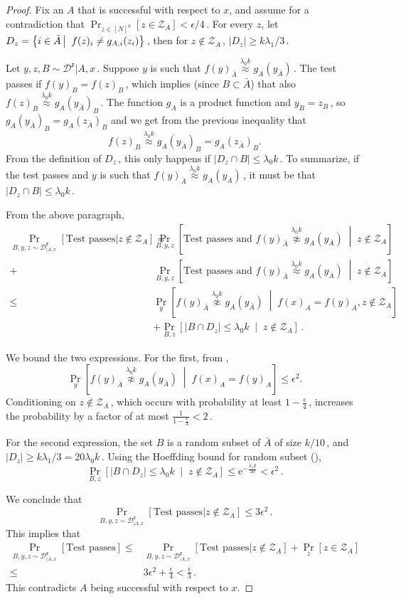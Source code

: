 \documentclass[11pt]{article}
\numberwithin{equation}{section}
\theoremstyle{definition}
\theoremstyle{plain}
\newcommand{\eee}{\mathrm e}
\newcommand{\Prob}[2][]{\Pr_{{#1}}\left[#2\right]} %
\newcommand{\abs}[1]{\lvert#1\rvert} %
\newcommand{\given}{\;\middle\vert\;} %
\newcommand\sett[2]{\left\{ #1 \left| \; \vphantom{#1 #2} \right. #2  \right\}} %
\newcommand\f{f} %
\newcommand{\g}{g} %
\newcommand\neql[1]{\stackrel{{#1}}{ \approx}} %
\newcommand\neqg[1]{\stackrel{{#1}}{ \not\approx}} %
\newcommand\rest[1]{{\bar{#1}}}  %
\newcommand\zi{\mathcal{Z}} %
\newcommand{\D}{\mathcal{D}^{\mathsf{z}}} %
\begin{document}
\begin{proof}
	Fix an $A$ that is successful with respect to $x$, and assume 
%
for a  %
contradiction that  $\Prob[{z\in[N]^k}]{z\in \zi_A}<
%
\epsilon/4$\,. %
    For every $z$, let $D_z = \sett{i\in\rest{A}}{\f(z)_i\neq \g_{A,i}(z_i)}$\,, then for $z\notin\zi_A$\,, $\abs{D_z}\geq 
	k\lambda_1/3$\,. %
	
	Let $y,z,B\sim \D|A,x$\,. Suppose $y$ is such that $\f(y)_{\rest{A}} \neql{\lambda_0 k} \g_A(y_{\rest{A}})$\,. The test passes if $\f(y)_B = \f(z)_B$\,, which implies (since $B\subset \bar A$) that also $\f(z)_B\neql{\lambda_0 k} \g_A(y_{\rest{A}})_B$\,. The function $\g_A$ is a product function and $y_B=z_B$\,, so $\g_A(y_\rest{A})_B= \g_A(z_\rest{A})_B$ and we get from the previous inequality that 
	\[\f(z)_B\neql{\lambda_0 k}   \g_A(y_\rest{A})_B= \g_A(z_\rest{A})_B.\] From the definition of $D_z$\,, this only happens if $\abs{D_z\cap B}\leq \lambda_0 k$\,. To summarize, if the test passes and $y$ is such that $\f(y)_{\rest{A}} \neql{\lambda_0 k} \g_A(y_{\rest{A}})$\,, it must be that $\abs{D_z\cap B}\leq \lambda_0 k$\,.
		

	From the above paragraph,
	\begin{align*}
	\Pr_{B,y,z\sim \D_{|A,x}}[\text{Test passes}| z\notin \zi_A] =&
	\Prob[B,y,z]{\text{Test passes and } \f(y)_{\rest{A}} \neqg{\lambda_0 k} \g_A(y_{\rest{A}})\given z\notin \zi_A}\\
	+& \Prob[B,y,z]{\text{Test passes and } \f(y)_{\rest{A}} \neql{\lambda_0 k} \g_A(y_{\rest{A}})\given z\notin \zi_A} \\\leq&
	\Prob[y]{\f(y)_{\rest{A}} \neqg{\lambda_0 k} \g_A(y_{\rest{A}})\given \f(x)_A = \f(y)_A,z\notin \zi_A}\\
&+\Prob[B,z]{\abs{B\cap D_z}\leq \lambda_0 k \given z\notin \zi_A}\,. %
	\end{align*}
	
	We bound the two expressions. For the first, from , 
	\[ \Prob[y]{\f(y)_{\rest{A}} \neqg{\lambda_0 k} \g_A(y_{\rest{A}})\given \f(x)_A = \f(y)_A} \leq\epsilon^2. \]
	Conditioning on $z\notin \zi_A$\,, which occurs with probability at least $1-\frac{\epsilon}{4}$\,, increases the probability by a factor of at most $\frac{1}{1-\frac{\epsilon}{4}}<2$\,.
	
	For the second expression, the set $B$ is a random subset of $\rest{A}$ of size $k/10$\,, and $\abs{D_z}\geq 
	k\lambda_1/3 %
	= 20\lambda_0 k$\,. Using
the  %
%
%
%
Hoeffding bound for random subset  %
(),
	\[ \Prob[B,z]{\abs{B\cap D_z}\leq \lambda_0 k \given z\notin \zi_A} \leq  \eee^{-\frac{\lambda_1 k}{20}} < \epsilon^2\,. \]%

	We conclude that
	\[ \Pr_{B,y,z\sim \D_{|A,x}}[\text{Test passes}| z\notin \zi_A] \leq 3\epsilon^2\,. \]%
	This implies that
	\begin{align*}
		\Pr_{B,y,z\sim \D_{|A,x}}[\text{Test passes}] \leq& \Pr_{B,y,z\sim \D_{|A,x}}[\text{Test passes}| z\notin \zi_A] + \Pr_z[z\in\zi_A]\\
		\leq& 3\epsilon^2 + \frac{\epsilon}{4} < \frac{\epsilon}{3}\,.%
	\end{align*}
    This contradicts $A$ being successful with respect to $x$.
\end{proof}
\end{document}
